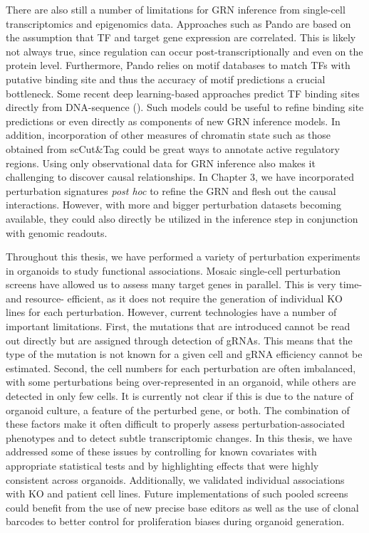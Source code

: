 There are also still a number of limitations for GRN inference from single-cell transcriptomics and epigenomics data. Approaches such as Pando are based on the assumption that TF and target gene expression are correlated. This is likely not always true, since regulation can occur post-transcriptionally and even on the protein level. Furthermore, Pando relies on motif databases to match TFs with putative binding site and thus the accuracy of motif predictions a crucial bottleneck. Some recent deep learning-based approaches predict TF binding sites directly from DNA-sequence (\cite{avsec_effective_2021,janssens_decoding_2022}). Such models could be useful to refine binding site predictions or even directly as components of new GRN inference models. In addition, incorporation of other measures of chromatin state such as those obtained from scCut\&Tag could be great ways to annotate active regulatory regions. Using only observational data for GRN inference also makes it challenging to discover causal relationships. In Chapter 3, we have incorporated perturbation signatures \textit{post hoc} to refine the GRN and flesh out the causal interactions. However, with more and bigger perturbation datasets becoming available, they could also directly be utilized in the inference step in conjunction with genomic readouts. 

Throughout this thesis, we have performed a variety of perturbation experiments in organoids to study functional associations. Mosaic single-cell perturbation screens have allowed us to assess many target genes in parallel. This is very time- and resource- efficient, as it does not require the generation of individual KO lines for each perturbation. However, current technologies have a number of important limitations. First, the mutations that are introduced cannot be read out directly but are assigned through detection of gRNAs. This means that the type of the mutation is not known for a given cell and gRNA efficiency cannot be estimated. Second, the cell numbers for each perturbation are often imbalanced, with some perturbations being over-represented in an organoid, while others are detected in only few cells. It is currently not clear if this is due to the nature of organoid culture, a feature of the perturbed gene, or both. The combination of these factors make it often difficult to properly assess perturbation-associated phenotypes and to detect subtle transcriptomic changes. In this thesis, we have addressed some of these issues by controlling for known covariates with appropriate statistical tests and by highlighting effects that were highly consistent across organoids. Additionally, we validated individual associations with KO and patient cell lines. Future implementations of such pooled screens could benefit from the use of new precise base editors as well as the use of clonal barcodes to better control for proliferation biases during organoid generation. 

